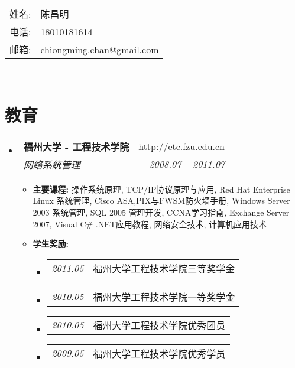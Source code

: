 \documentclass[11pt,letterpaper]{article}
\makeatletter
\newcommand{\twocol}[2]{
\begin{tabular}{p{1.4cm}l}
	\textit{#1} & #2\\
\end{tabular}}
\newcommand{\resitem}[1]{\item #1 \vspace{-2pt}}
\newcommand{\ressubheading}[4]{
\begin{tabular*}{6.5in}{l@{\extracolsep{\fill}}r}
	\textbf{#1} & \url{#2} \\
	\textit{#3} & \textit{#4} \\
\end{tabular*}\vspace{-6pt}}
\makeatother
\begin{document}
\begin{CJK}{UTF8}{gbsn}

\begin{tabular}{p{1.2cm}l}
	姓名: & 陈昌明\\
	电话: & 18010181614\\
	邮箱: & chiongming.chan@gmail.com\\
\end{tabular}
\\
\vspace{0.1in}

\section{教育}  
	\begin{itemize}
	 	\item    
			\ressubheading{福州大学 - 工程技术学院}{http://etc.fzu.edu.cn}{网络系统管理}{2008.07 -- 2011.07}
				{ \footnotesize
				\begin{itemize}
						\resitem{\textbf{主要课程: }操作系统原理, TCP/IP协议原理与应用, Red Hat Enterprise Linux 系统管理, Cisco ASA,PIX与FWSM防火墙手册, Windows Server 2003 系统管理, SQL 2005 管理开发, CCNA学习指南, Exchange Server 2007, Visual C\# .NET应用教程, 网络安全技术, 计算机应用技术}
						\resitem{\textbf{学生奖励: }}
						\begin{itemize}
							\item{\twocol{2011.05}{福州大学工程技术学院三等奖学金}}
							\item{\twocol{2010.05}{福州大学工程技术学院一等奖学金}}
							\item{\twocol{2010.05}{福州大学工程技术学院优秀团员}}
							\item{\twocol{2009.05}{福州大学工程技术学院优秀学员}}
						\end{itemize}
				\end{itemize}
			 	}
	\end{itemize}


\end{CJK}
\end{document}
